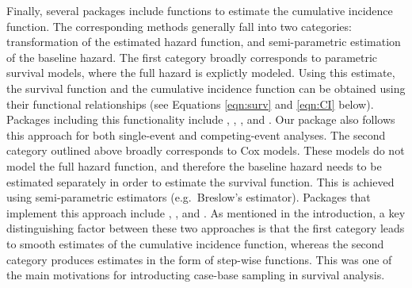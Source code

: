 \documentclass[
]{jss}
\begin{document}
Finally, several packages include functions to estimate the cumulative
incidence function. The corresponding methods generally fall into two
categories: transformation of the estimated hazard function, and
semi-parametric estimation of the baseline hazard. The first category
broadly corresponds to parametric survival models, where the full hazard
is explictly modeled. Using this estimate, the survival function and the
cumulative incidence function can be obtained using their functional
relationships (see Equations \ref{eqn:surv} and \ref{eqn:CI} below).
Packages including this functionality include , ,
, and . Our package  also follows
this approach for both single-event and competing-event analyses. The
second category outlined above broadly corresponds to Cox models. These
models do not model the full hazard function, and therefore the baseline
hazard needs to be estimated separately in order to estimate the
survival function. This is achieved using semi-parametric estimators
(e.g.~Breslow's estimator). Packages that implement this approach
include , , and . As
mentioned in the introduction, a key distinguishing factor between these
two approaches is that the first category leads to smooth estimates of
the cumulative incidence function, whereas the second category produces
estimates in the form of step-wise functions. This was one of the main
motivations for introducting case-base sampling in survival analysis.
\end{document}

